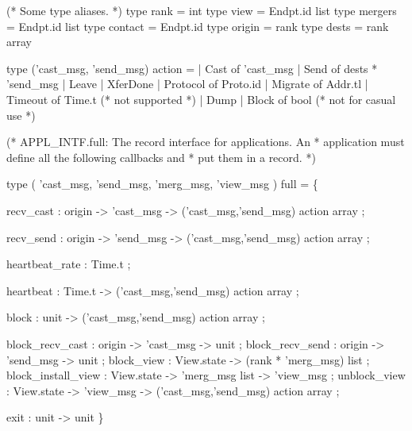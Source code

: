 \begin{codebox}
(* Some type aliases.
 *)
type rank	= int
type view 	= Endpt.id list
type mergers 	= Endpt.id list
type contact 	= Endpt.id
type origin 	= rank
type dests 	= rank array

type ('cast_msg, 'send_msg) action =
  | Cast of 'cast_msg
  | Send of dests * 'send_msg
  | Leave
  | XferDone
  | Protocol of Proto.id
  | Migrate of Addr.tl
  | Timeout of Time.t		        (* not supported *)
  | Dump
  | Block of bool			(* not for casual use *)
\end{codebox}
\begin{codebox}
(* APPL_INTF.full: The record interface for applications.  An
 * application must define all the following callbacks and
 * put them in a record.
 *)

type (
  'cast_msg,
  'send_msg,
  'merg_msg,
  'view_msg
) full = \{

  recv_cast             : origin -> 'cast_msg ->
    ('cast_msg,'send_msg) action array ;

  recv_send             : origin -> 'send_msg ->
    ('cast_msg,'send_msg) action array ;

  heartbeat_rate        : Time.t ;

  heartbeat             : Time.t ->
    ('cast_msg,'send_msg) action array ;

  block                 : unit ->
    ('cast_msg,'send_msg) action array ;

  block_recv_cast       : origin -> 'cast_msg -> unit ;
  block_recv_send       : origin -> 'send_msg -> unit ;
  block_view            : View.state -> (rank * 'merg_msg) list ;
  block_install_view    : View.state -> 'merg_msg list -> 'view_msg ;
  unblock_view          : View.state -> 'view_msg ->
    ('cast_msg,'send_msg) action array ;

  exit                  : unit -> unit
\}
\end{codebox}

